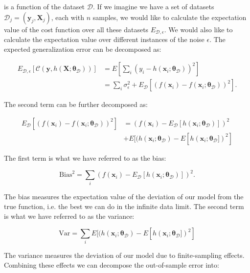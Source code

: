 is a function of the dataset $\mathcal{D}$. If we imagine we have a set of
datasets $\mathcal{D}_j = (\bm{y}_j, \bm{X}_j)$, each with $n$ samples, we would like to calculate
the expectation value of the cost function over all these datasets $E_{\mathcal{D}, \epsilon}$.
We would also like to calculate the expectation value over different instances of the noise $\epsilon$.
The expected generalization error can be decomposed as:

\begin{equation}
\begin{split}
    E_{\mathcal{D}, \epsilon} [\mathcal{C}(\bm{y}, h(\bm{X} ; \bm{\theta}_{\mathcal{D}}))]
    &= E \left[ \sum_i (y_i - h(\bm{x}_i ; \bm{\theta}_{\mathcal{D}}))^2 \right] \\
    &= \sum_i \sigma_{\epsilon}^2 + E_{\mathcal{D}}[(f(\bm{x}_i) - f(\bm{x}_i ; \bm{\theta}_{\mathcal{D}}))^2] .
\end{split}
\end{equation}

The second term can be further decomposed as:

\begin{equation}
\begin{split}
    E_{\mathcal{D}}[(f(\bm{x}_i) - f(\bm{x}_i ; \bm{\theta}_{\mathcal{D}}))^2]
    &= (f(\bm{x}_i) - E_{\mathcal{D}}[h(\bm{x}_i ; \bm{\theta}_{\mathcal{D}})])^2
    \\
    &+ E[(h(\bm{x}_i ; \bm{\theta}_{\mathcal{D}}) - E[h(\bm{x}_i ; \bm{\theta}_{\mathcal{D}}])^2]
\end{split}
\end{equation}

The first term is what we have referred to as the bias:

\begin{equation}
    \text{Bias}^2 = \sum_i (f(\bm{x}_i) - E_{\mathcal{D}}[h(\bm{x}_i ; \bm{\theta}_{\mathcal{D}})])^2.
\end{equation}

The bias measures the expectation value of the deviation of our model from the true
function, i.e. the best we can do in the infinite data limit.
The second term is what we have referred to as the variance:

\begin{equation}
    \text{Var} = \sum_i  E[(h(\bm{x}_i ; \bm{\theta}_{\mathcal{D}}) - E[h(\bm{x}_i ; \bm{\theta}_{\mathcal{D}}])^2]
\end{equation}

The variance measures the deviation of our model due to finite-sampling effects.
Combining these effects we can decompose the out-of-sample error into:

